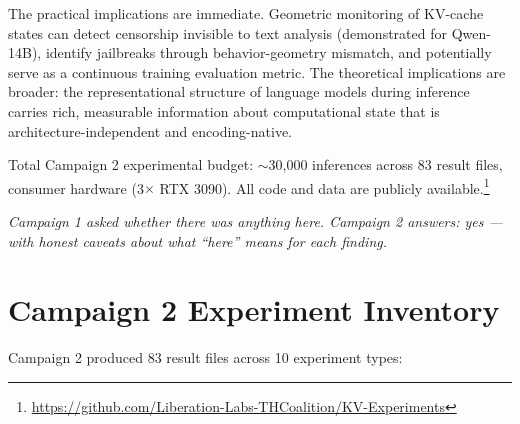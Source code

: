 \documentclass[11pt,a4paper]{article}
\begin{document}
The practical implications are immediate. Geometric monitoring of KV-cache states can detect censorship invisible to text analysis (demonstrated for Qwen-14B), identify jailbreaks through behavior-geometry mismatch, and potentially serve as a continuous training evaluation metric. The theoretical implications are broader: the representational structure of language models during inference carries rich, measurable information about computational state that is architecture-independent and encoding-native.

Total Campaign 2 experimental budget: $\sim$30,000 inferences across 83 result files, consumer hardware (3$\times$ RTX 3090). All code and data are publicly available.\footnote{\url{https://github.com/Liberation-Labs-THCoalition/KV-Experiments}}

\medskip
\noindent\emph{Campaign 1 asked whether there was anything here. Campaign 2 answers: yes --- with honest caveats about what ``here'' means for each finding.}




\appendix

\section{Campaign 2 Experiment Inventory}
\label{app:inventory}

Campaign 2 produced 83 result files across 10 experiment types:
\end{document}
